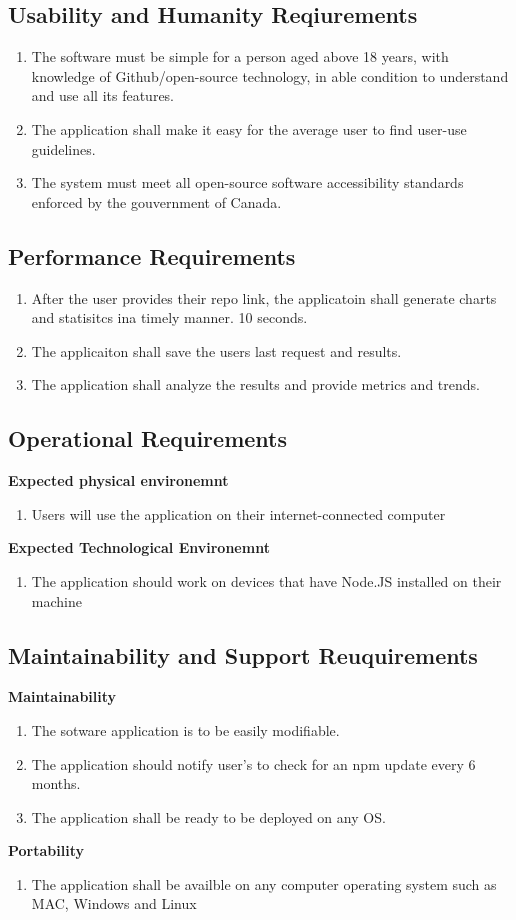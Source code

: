 \documentclass{article}
\begin{document}
\subsection{Usability and Humanity Reqiurements}
\begin{enumerate}
\item The software must be simple for a person aged above 18 years, with knowledge of Github/open-source technology, in able condition to understand and use all its features.
\item The application shall make it easy for the average user to find user-use guidelines.
\item The system must meet all open-source software accessibility standards enforced by the gouvernment of Canada. 
\end{enumerate}
\subsection{Performance Requirements}
\begin{enumerate}
\item After the user provides their repo link, the applicatoin shall generate charts and statisitcs ina timely manner.  10 seconds. 
\item The applicaiton shall save the users last request and results. 
\item The application shall analyze the results and provide metrics and trends. 
\end{enumerate}
\subsection{Operational Requirements}
\textbf{Expected physical environemnt }
\begin{enumerate}
\item Users will use the application on their internet-connected computer 
\end{enumerate}
\textbf{Expected Technological Environemnt }
\begin{enumerate}
\item The application should work on devices that have Node.JS installed on their machine 
\end{enumerate}
\subsection{Maintainability and Support Reuquirements}
\textbf{Maintainability} 
\begin{enumerate}
\item The sotware application is to be easily modifiable.
\item The application should notify user's to check for an npm update every 6 months. 
\item The application shall be ready to be deployed on any OS. 
\end{enumerate}
\textbf{Portability} 
\begin{enumerate}
\item The application shall be availble on any computer operating system such as MAC, Windows and Linux
\end{enumerate}
\end{document}
